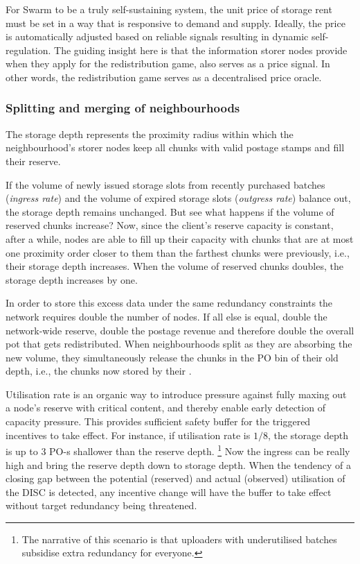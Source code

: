 For Swarm to be a truly self-sustaining system, the unit price of storage rent must be set in a way that is responsive to demand and supply. Ideally, the price is automatically adjusted based on reliable signals resulting in dynamic self-regulation. The guiding insight here is that the information storer nodes provide when  they apply for the redistribution game, also serves as a price signal. In other words, the redistribution game serves as a decentralised price oracle.



\subsubsection{Splitting and merging of neighbourhoods}

The storage depth represents the proximity radius within which the neighbourhood's storer nodes keep all chunks with valid postage stamps and fill their reserve. 


If the volume of newly issued storage slots from recently purchased batches (\emph{ingress rate}\/) and the volume of expired storage slots (\emph{outgress rate}\/) balance out, the storage depth remains unchanged.
But see what happens  if the volume of  reserved chunks increase?
Now, since the client's reserve capacity is constant, after a while, nodes are able to fill up their capacity with chunks that are at most one proximity order closer to them than the farthest chunks were previously, i.e.,  their storage depth increases.
When the volume of reserved chunks doubles,  the storage depth increases by one.  

In order to store this excess data under the same redundancy constraints the network requires double the number of nodes. If all else is equal, double the network-wide reserve, double the postage revenue and therefore double the overall pot that gets redistributed. When neighbourhoods split as they are absorbing the new volume, they simultaneously release the chunks in the PO bin of their old depth, i.e., the chunks now stored by their . 

Utilisation rate is an organic way to  introduce pressure against fully maxing out a node's reserve with critical content, and thereby enable early detection of capacity pressure. This provides  sufficient safety buffer for the triggered incentives to take effect. For instance,  if utilisation rate is $1/8$, the storage depth is up to 3 PO-s shallower than the reserve depth.%
%
\footnote{The narrative of this scenario is that uploaders with underutilised batches subsidise extra redundancy for everyone.}
%
Now the ingress can be really high and bring the reserve depth down to storage depth. When the tendency of a closing gap between the potential (reserved) and actual (observed) utilisation of the DISC is detected, any incentive change will have the buffer to take effect without target redundancy being threatened. 

